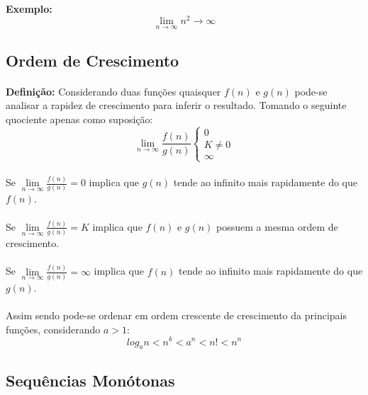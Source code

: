 \documentclass{article}
\begin{document}
\begin{enumerate}[rightmargin = \leftmargin]
        \paragraph{}\textbf{Exemplo:} 
            \[\lim_{n\to\infty}n^{2} \rightarrow \infty\]
    
    \subsection{Ordem de Crescimento}
        \paragraph{}\textbf{Definição:} Considerando duas funções quaisquer $f(n)$ e $g(n)$ pode-se analisar a rapidez de crescimento para inferir o resultado. Tomando o seguinte quociente apenas como suposição:
            \[\lim\limits_{n\to\infty}\frac{f(n)}{g(n)}\left \{ \begin{matrix} 0\\ K\ne0\\ \infty\end{matrix}\right.\]
        \paragraph{}Se $\lim\limits_{n\to\infty}\frac{f(n)}{g(n)}=0$ implica que $g(n)$ tende ao infinito mais rapidamente do que $f(n)$.
        \paragraph{}Se $\lim\limits_{n\to\infty}\frac{f(n)}{g(n)}=K$ implica que $f(n)$ e $g(n)$ possuem a mesma ordem de crescimento.
        \paragraph{}Se $\lim\limits_{n\to\infty}\frac{f(n)}{g(n)}=\infty$ implica que $f(n)$ tende ao infinito mais rapidamente do que $g(n)$.
        \paragraph{}Assim sendo pode-se ordenar em ordem crescente de crescimento da principais funções, considerando $a>1$:
            \[log_{a}n < n^k < a^n < n! < n^n \]
            
    \subsection{Sequências Monótonas}

\end{enumerate}
\end{document}
